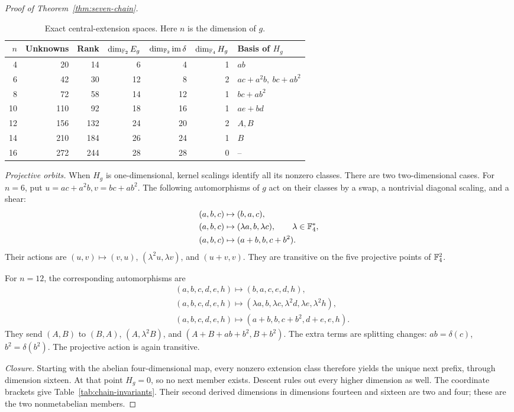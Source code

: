 \begin{proof}[Proof of Theorem~\ref{thm:seven-chain}]
\begin{table}[ht]
\centering
\caption{Exact central-extension spaces. Here \(n\) is the dimension of \(g\).}
\label{tab:extension-ranks}
\begin{tabular}{@{}rrrrrrl@{}}
\toprule
\(n\)&Unknowns&Rank&\(\dim_{\mathbb F_2}E_g\)&\(\dim_{\mathbb F_2}\operatorname{im}\delta\)&
\(\dim_{\mathbb F_4}H_g\)&Basis of \(H_g\)\\
\midrule
4&20&14&6&4&1&\(ab\)\\
6&42&30&12&8&2&\(ac+a^2b,\ bc+ab^2\)\\
8&72&58&14&12&1&\(bc+ab^2\)\\
10&110&92&18&16&1&\(ae+bd\)\\
12&156&132&24&20&2&\(A,B\)\\
14&210&184&26&24&1&\(B\)\\
16&272&244&28&28&0&--\\
\bottomrule
\end{tabular}
\end{table}

\emph{Projective orbits.}
When \(H_g\) is one-dimensional, kernel scalings identify all its
nonzero classes. There are two two-dimensional cases.
For \(n=6\), put \(u=ac+a^2b,v=bc+ab^2\).
The following automorphisms of \(g\) act on their classes by a swap,
a nontrivial diagonal scaling, and a shear:
\begin{align*}
 &(a,b,c)\mapsto(b,a,c),\\
 &(a,b,c)\mapsto(\lambda a,b,\lambda c),
       \qquad\lambda\in\mathbb F_4^*,\\
 &(a,b,c)\mapsto(a+b,b,c+b^2).
\end{align*}
Their actions are \((u,v)\mapsto(v,u)\),
\((\lambda^2u,\lambda v)\), and \((u+v,v)\).
They are transitive on the five projective points of \(\mathbb F_4^2\).

For \(n=12\), the corresponding automorphisms are
\begin{align*}
 &(a,b,c,d,e,h)\mapsto(b,a,c,e,d,h),\\
 &(a,b,c,d,e,h)\mapsto
       (\lambda a,b,\lambda c,\lambda^2d,\lambda e,\lambda^2h),\\
 &(a,b,c,d,e,h)\mapsto(a+b,b,c+b^2,d+e,e,h).
\end{align*}
They send \((A,B)\) to \((B,A)\), \((A,\lambda^2B)\), and
\((A+B+ab+b^2,B+b^2)\). The extra terms are splitting changes:
\(ab=\delta(c)\), \(b^2=\delta(b^2)\).
The projective action is again transitive.

\emph{Closure.}
Starting with the abelian four-dimensional map, every nonzero extension
class therefore yields the unique next prefix, through dimension sixteen.
At that point \(H_g=0\), so no next member exists. Descent rules out
every higher dimension as well.
The coordinate brackets give Table~\ref{tab:chain-invariants}.
Their second derived dimensions in dimensions fourteen and sixteen are
two and four; these are the two nonmetabelian members.
\end{proof}


